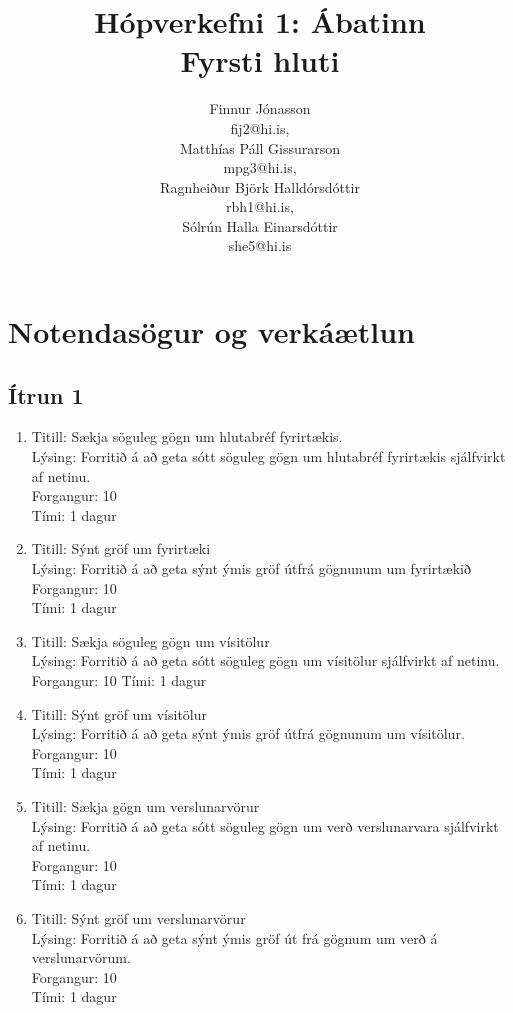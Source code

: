 \documentclass[a4,12pt]{article}
\author{
Finnur Jónasson\\ fij2@hi.is,\\
Matthías Páll Gissurarson\\ mpg3@hi.is,\\
Ragnheiður Björk Halldórsdóttir\\ rbh1@hi.is,\\
Sólrún Halla Einarsdóttir\\ she5@hi.is
}
\title{Hópverkefni 1: Ábatinn\\
Fyrsti hluti}
\begin{document}
\maketitle

\section{Notendasögur og verkáætlun}

\subsection{Ítrun 1}
\begin{enumerate}[]

\item Titill: Sækja söguleg gögn um hlutabréf fyrirtækis.\\
Lýsing: Forritið á að geta sótt söguleg gögn um hlutabréf fyrirtækis sjálfvirkt af netinu.\\
Forgangur: 10\\
Tími: 1 dagur

\item Titill: Sýnt gröf um fyrirtæki\\
Lýsing: Forritið á að geta sýnt ýmis gröf útfrá gögnunum um fyrirtækið
Forgangur: 10\\
Tími: 1 dagur

\item Titill: Sækja söguleg gögn um vísitölur\\
Lýsing: Forritið á að geta sótt söguleg gögn um vísitölur sjálfvirkt af netinu.\\
Forgangur: 10
Tími: 1 dagur

\item Titill: Sýnt gröf um vísitölur\\
Lýsing: Forritið á að geta sýnt ýmis gröf útfrá gögnunum um vísitölur.\\
Forgangur: 10\\
Tími: 1 dagur

\item Titill: Sækja gögn um verslunarvörur\\
Lýsing: Forritið á að geta sótt söguleg gögn um verð verslunarvara sjálfvirkt af netinu.\\
Forgangur: 10\\
Tími: 1 dagur

\item Titill: Sýnt gröf um verslunarvörur\\
Lýsing: Forritið á að geta sýnt ýmis gröf út frá gögnum um verð á verslunarvörum.\\
Forgangur: 10\\
Tími: 1 dagur


\end{enumerate}
\end{document}
